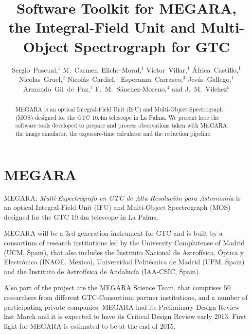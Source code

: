 
\resetcounters


\title{Software Toolkit for MEGARA, the Integral-Field Unit and Multi-Object Spectrograph
for GTC}
\author{Sergio~Pascual,$^1$ M.~Carmen~Eliche-Moral,$^1$ 
V\'ictor~Villar,$^1$ \'Africa~Castillo,$^1$ Nicolas~Gruel,$^2$ 
Nicol\'as~Cardiel,$^1$ Esperanza~Carrasco,$^3$ Jes\'us~Gallego,$^1$ 
Armando~Gil~de~Paz,$^1$ F.~M.~S\'anchez-Moreno,$^4$
and J.~M.~V\'ilchez$^5$
}


\begin{abstract}
MEGARA is an optical Integral-Field Unit (IFU) and Multi-Object Spectrograph (MOS) designed for the GTC 10.4m telescope in La Palma. 
We present here the software tools developed to prepare and process observations taken with MEGARA: the image simulator, the exposure-time calculator and the reduction pipeline.
\end{abstract}

\section{MEGARA}
MEGARA: \emph{Multi-Espectr\'ografo en GTC de Alta Resoluci\'on para Astronom\'ia}
 is an optical Integral-Field Unit (IFU) and Multi-Object Spectrograph (MOS) designed for the GTC 10.4m telescope in La Palma.

MEGARA will be a 3rd generation instrument for GTC and is built by a consortium of research institutions led by the University Complutense of Madrid (UCM, Spain), that also includes the Instituto Nacional de Astrof\'isica, \'Optica y Electr\'onica (INAOE, Mexico), Universidad Polit\'ecnica de Madrid (UPM, Spain) and the Instituto de Astrof\'isica de Andaluc\'ia  (IAA-CSIC, Spain).

Also part of the project are the MEGARA Science Team, that comprises 50 researchers from different GTC-Consortium partner institutions, and a number of participating private companies.  MEGARA had its Preliminary Design Review last March and it is expected to have its Critical Design Review early 2013. First light for MEGARA is estimated to be at the end of 2015.

